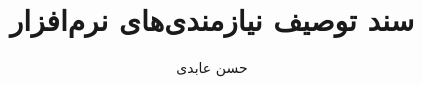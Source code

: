 \documentclass[12pt,fleqn,oneside]{book}
\begin{document}
\title{سند توصیف نیازمندی‌های نرم‌افزار \\ }
\author{حسن عابدی}
\BgThispage
\maketitle
\tableofcontents
\clearpage
\pagestyle{plain}







\end{document}

